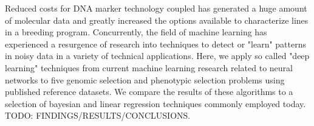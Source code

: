 Reduced costs for DNA marker technology coupled has generated a huge amount of
molecular data and greatly increased the options available to characterize lines 
in a breeding program. Concurrently, the field of machine learning has experienced
a resurgence of research into techniques to detect or "learn" patterns in noisy
data in a variety of technical applications. Here, we apply so called "deep learning"
techniques from current machine learning research related to neural networks to five 
genomic selection and phenotypic selection problems using published reference datasets. 
We compare the results of these algorithms to a selection of bayesian and linear 
regression techniques commonly employed today. TODO: FINDINGS/RESULTS/CONCLUSIONS.


%


